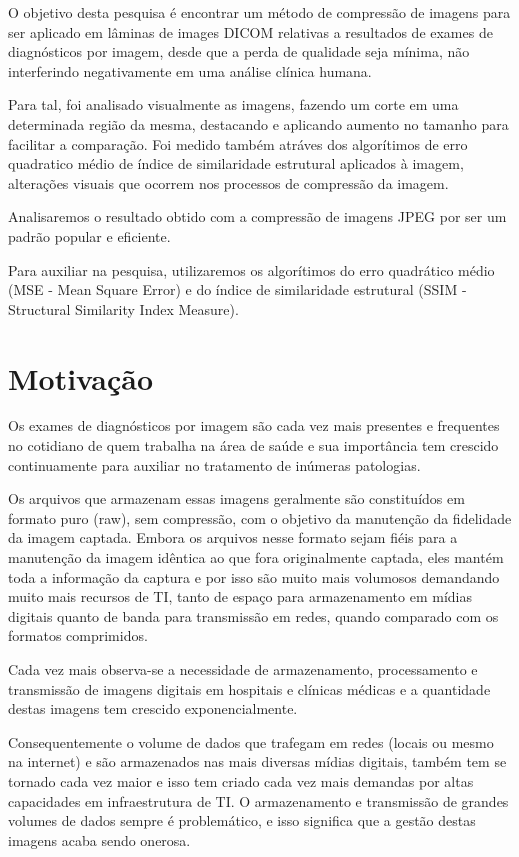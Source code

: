 \documentclass{IEEEtran}
\begin{document}
O objetivo desta pesquisa é encontrar um método de compressão de imagens
para ser aplicado em lâminas de images DICOM relativas a resultados de
exames de diagnósticos por imagem, desde que a perda de qualidade seja
mínima, não interferindo negativamente em uma análise clínica humana.

Para tal, foi analisado visualmente as imagens, fazendo um corte em uma
determinada região da mesma, destacando e aplicando aumento no tamanho
para facilitar a comparação. Foi medido também atráves dos algorítimos
de erro quadratico médio de índice de similaridade estrutural aplicados
à imagem, alterações visuais que ocorrem nos processos de compressão da
imagem.

Analisaremos o resultado obtido com a compressão de imagens JPEG por ser
um padrão popular e eficiente.

Para auxiliar na pesquisa, utilizaremos os algorítimos do erro
quadrático médio (MSE - Mean Square Error) e do índice de similaridade
estrutural (SSIM - Structural Similarity Index
Measure).\cite{arthur2017making}

    \section{Motivação}\label{motivauxe7uxe3o}

    Os exames de diagnósticos por imagem são cada vez mais presentes e
frequentes no cotidiano de quem trabalha na área de saúde e sua
importância tem crescido continuamente para auxiliar no tratamento de
inúmeras patologias.

Os arquivos que armazenam essas imagens geralmente são constituídos em
formato puro (raw), sem compressão, com o objetivo da manutenção da
fidelidade da imagem captada. Embora os arquivos nesse formato sejam
fiéis para a manutenção da imagem idêntica ao que fora originalmente
captada, eles mantém toda a informação da captura e por isso são muito
mais volumosos demandando muito mais recursos de TI, tanto de espaço
para armazenamento em mídias digitais quanto de banda para transmissão
em redes, quando comparado com os formatos comprimidos.

Cada vez mais observa-se a necessidade de armazenamento, processamento e
transmissão de imagens digitais em hospitais e clínicas médicas e a
quantidade destas imagens tem crescido exponencialmente.

Consequentemente o volume de dados que trafegam em redes (locais ou
mesmo na internet) e são armazenados nas mais diversas mídias digitais,
também tem se tornado cada vez maior e isso tem criado cada vez mais
demandas por altas capacidades em infraestrutura de TI. O armazenamento
e transmissão de grandes volumes de dados sempre é problemático, e isso
significa que a gestão destas imagens acaba sendo onerosa.
\end{document}
